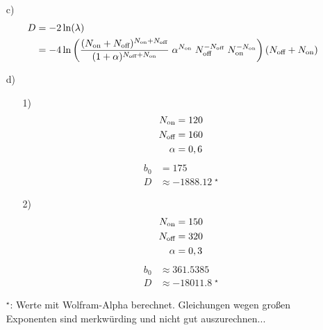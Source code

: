 \begin{itemize}
	\item[c)]
		\begin{align*}
			D &= -2\ln(\lambda)	\\
				&= -4\ln\left( \frac{(N_{\text{on}}+N_{\text{off}})^{N_{\text{on}}+N_{\text{off}}}}{(1+\alpha)^{N_{\text{off}}+N_{\text{on}}}}\; \alpha^{N_{\text{on}}}\; N_{\text{off}}^{-N_{\text{off}}}\; N_{\text{on}}^{-N_{\text{on}}}\right) (N_{\text{off}} + N_{\text{on}})
		\end{align*}
		
	\item[d)]
		\begin{itemize}
			\item[1)]
				\begin{align*}
					N_{\text{on}} &= 120	\\
					N_{\text{off}} &= 160	\\
					\alpha &= 0,6
				\end{align*}
				\begin{align*}
					b_0 &= 175	\\
					D &\approx -\num{1888,12}\;^\star
				\end{align*}
			\item[2)]
				\begin{align*}
					N_{\text{on}} &= 150	\\
					N_{\text{off}} &= 320	\\
					\alpha &= 0,3
				\end{align*}
				\begin{align*}
					b_0 &\approx \num{361,5385}	\\
					D &\approx -\num{18011,8}\;^\star
				\end{align*}
		\end{itemize}
		$^\star$: Werte mit Wolfram-Alpha berechnet. Gleichungen wegen großen Exponenten sind merkwürding und nicht gut auszurechnen...
\end{itemize}




